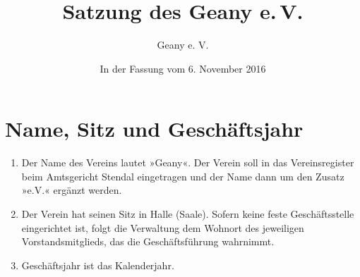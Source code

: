 \documentclass[fontsize=12pt,paper=a4,pagesize,headings=small]{scrartcl}
\title{Satzung des Geany e.\,V.}
\author{Geany e. V.}
\date{In der Fassung vom 6. November 2016}
\begin{document}
\maketitle{}

\section{Name, Sitz und Geschäftsjahr}
\begin{enumerate}
    \item Der Name des Vereins lautet »Geany«. Der Verein soll in das
    Vereinsregister beim Amtsgericht Stendal eingetragen und der Name
    dann um den Zusatz »e.V.« ergänzt werden.

    \item Der Verein hat seinen Sitz in Halle (Saale). Sofern keine
    feste Geschäftsstelle eingerichtet ist, folgt die Verwaltung dem
    Wohnort des jeweiligen Vorstandsmitglieds, das die Geschäftsführung
    wahrnimmt.

    \item Geschäftsjahr ist das Kalenderjahr.
\end{enumerate}
\end{document}
